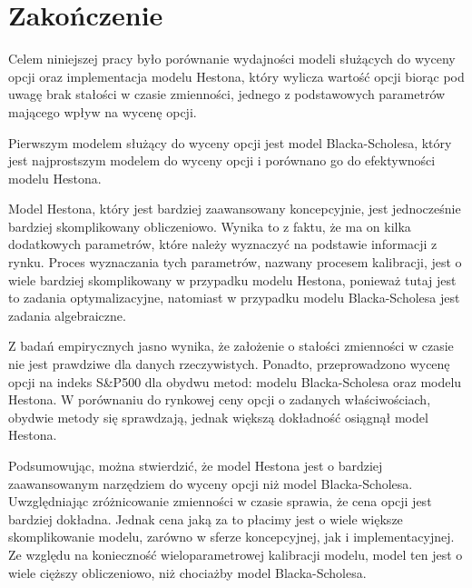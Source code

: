 \documentclass{pracamgr}
\begin{document}
 \chapter*{Zakończenie}\label{r:ending}

Celem niniejszej pracy było porównanie wydajności modeli służących do wyceny
opcji oraz implementacja modelu Hestona, który wylicza wartość opcji biorąc
pod uwagę brak stałości w czasie zmienności, jednego z podstawowych parametrów
mającego wpływ na wycenę opcji. 

Pierwszym modelem służący do wyceny opcji jest model Blacka-Scholesa, który jest
najprostszym modelem do wyceny opcji i porównano go do efektywności modelu 
Hestona. 

Model Hestona, który jest bardziej zaawansowany koncepcyjnie, jest jednocześnie 
bardziej skomplikowany obliczeniowo. Wynika to z faktu, że ma on kilka dodatkowych
parametrów, które należy wyznaczyć na podstawie informacji z rynku. Proces wyznaczania tych 
parametrów, nazwany procesem kalibracji, jest o wiele bardziej skomplikowany w przypadku 
modelu Hestona, ponieważ tutaj jest to zadania optymalizacyjne, natomiast w przypadku modelu
Blacka-Scholesa jest zadania algebraiczne.


Z badań empirycznych jasno wynika, że założenie o stałości zmienności w czasie nie jest 
prawdziwe dla danych rzeczywistych. Ponadto, przeprowadzono wycenę opcji na indeks 
S\&P500 dla obydwu metod: modelu Blacka-Scholesa oraz modelu Hestona. 
W porównaniu do rynkowej ceny opcji o zadanych właściwościach, obydwie metody się 
sprawdzają, jednak większą dokładność osiągnął model Hestona.


Podsumowując, można stwierdzić, że model Hestona jest o bardziej zaawansowanym
narzędziem do wyceny opcji niż model Blacka-Scholesa. Uwzględniając zróżnicowanie zmienności 
w czasie sprawia, że cena opcji jest bardziej dokładna. Jednak cena jaką za to płacimy 
jest o wiele większe skomplikowanie modelu, zarówno w sferze koncepcyjnej, jak i 
implementacyjnej. Ze względu na konieczność wieloparametrowej kalibracji modelu, 
model ten jest o wiele cięższy obliczeniowo, niż chociażby model Blacka-Scholesa.


\appendix

\listoffigures
{} 
\listoflistings
{} 
\end{document}
